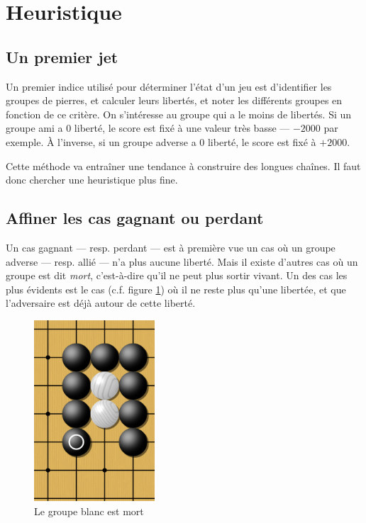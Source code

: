 \documentclass[11pt,a4paper,titlepage,french]{article}
\begin{document}
	\section{Heuristique}

		\subsection{Un premier jet}
			Un premier indice utilisé pour déterminer l'état d'un jeu est d'identifier les groupes de pierres, et calculer leurs libertés, et noter les différents groupes en fonction de ce critère. On s'intéresse au groupe qui a le moins de libertés. Si un groupe ami a 0 liberté, le score est fixé à une valeur très basse --- $-2000$ par exemple. À l'inverse, si un groupe adverse a 0 liberté, le score est fixé à $+2000$.

			Cette méthode va entraîner une tendance à construire des longues chaînes. Il faut donc chercher une heuristique plus fine.

		\subsection{Affiner les cas gagnant ou perdant}
			Un cas gagnant --- resp. perdant --- est à première vue un cas où un groupe adverse --- resp. allié --- n'a plus aucune liberté. Mais il existe d'autres cas où un groupe est dit \emph{mort}, c'est-à-dire qu'il ne peut plus sortir vivant. Un des cas les plus évidents est le cas (c.f. figure \ref{groupemort}) où il ne reste plus qu'une libertée, et que l'adversaire est déjà autour de cette liberté.

			\begin{figure}[hbt]
			\begin{center}
			\includegraphics[width=0.4\textwidth]{groupemort.png}
			\end{center}
			\caption{Le groupe blanc est mort}
			\label{groupemort}
			\end{figure}
\end{document}
